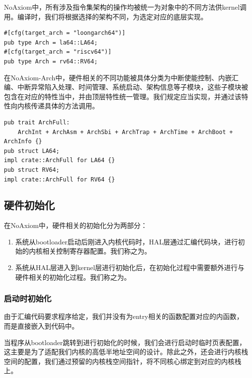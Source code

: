 \documentclass{article}
\begin{document}
NoAxiom中，所有涉及指令集架构的操作均被统一为对象中的不同方法供kernel调用。编译时，我们将根据选择的架构不同，为选定对应的底层实现。

\begin{lstlisting}
#[cfg(target_arch = "loongarch64")]
pub type Arch = la64::LA64;
#[cfg(target_arch = "riscv64")]
pub type Arch = rv64::RV64;
\end{lstlisting}

在NoAxiom-Arch中，硬件相关的不同功能被具体分类为中断使能控制、内嵌汇编、中断异常陷入处理、时间管理、系统启动、架构信息等子模块，这些子模块被包含在对应的特性当中，并由顶层特性统一管理。我们规定应当实现，并通过该特性向内核传递具体的方法调用。

\begin{lstlisting}
pub trait ArchFull:
    ArchInt + ArchAsm + ArchSbi + ArchTrap + ArchTime + ArchBoot + ArchInfo {}
pub struct LA64;
impl crate::ArchFull for LA64 {}
pub struct RV64;
impl crate::ArchFull for RV64 {}
\end{lstlisting}

\subsection{硬件初始化}\label{sec:hardware_bootstrap}

在NoAxiom中，硬件相关的初始化分为两部分：

\begin{enumerate}
    \item 系统从bootloader启动后刚进入内核代码时，HAL层通过汇编代码块，进行初始的内核相关控制寄存器配置。我们称之为。
    \item 系统从HAL层进入到kernel层进行初始化后，在初始化过程中需要额外进行与硬件相关的初始化过程。我们称之为。
\end{enumerate}

\subsubsection{启动时初始化}

由于汇编代码要求程序给定，我们并没有为entry相关的函数配置对应的内函数，而是直接嵌入到代码中。

当程序从bootloader跳转到进行初始化的时候，我们会进行启动时临时页表配置，这主要是为了适配我们内核的高低半地址空间的设计。除此之外，还会进行内核栈空间的配置，我们通过预留的内核栈空间指针，将不同核心绑定到对应的内核栈上。
\end{document}
